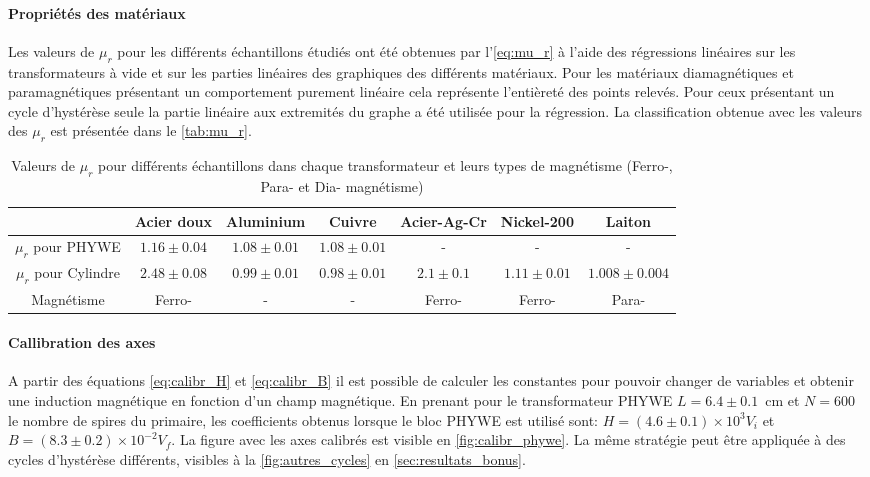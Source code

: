 \paragraph{Propriétés des matériaux}
Les valeurs de \(\mu_r\) pour les différents échantillons étudiés ont été obtenues par l'\autoref{eq:mu_r} à l'aide des régressions linéaires sur les transformateurs à vide et sur les parties linéaires des graphiques des différents matériaux. Pour les matériaux diamagnétiques et paramagnétiques présentant un comportement purement linéaire cela représente l'entièreté des points relevés. Pour ceux présentant un cycle d'hystérèse seule la partie linéaire aux extremités du graphe a été utilisée pour la régression. La classification obtenue avec les valeurs des \(\mu_r\) est présentée dans le \autoref{tab:mu_r}.

\begin{table}[h]
    \vspace{5pt}
    \centering
    \begin{adjustbox}{width=\textwidth}
        \begin{tabulary}{\linewidth}{|c c c c c c c|}
            \toprule
            & Acier doux & Aluminium & Cuivre & Acier-Ag-Cr & Nickel-200 & Laiton \\
            \midrule
            \(\mu_r\) pour PHYWE & \(1.16 \pm 0.04\) & \(1.08 \pm 0.01\) & \(1.08 \pm 0.01\) & - & - & - \\
            \(\mu_r\) pour Cylindre & \(2.48 \pm 0.08\) & \(0.99 \pm 0.01\) & \(0.98 \pm 0.01\) & \(2.1 \pm 0.1\) & \(1.11 \pm 0.01\) & \(1.008 \pm 0.004\) \\
            Magnétisme & Ferro- & - & - & Ferro- & Ferro- & Para- \\
            \bottomrule
        \end{tabulary}
    \end{adjustbox}
    \caption{Valeurs de \(\mu_r\) pour différents échantillons dans chaque transformateur et leurs types de magnétisme (Ferro-, Para- et Dia- magnétisme)}
    \label{tab:mu_r}
\end{table}

\paragraph{Callibration des axes}
A partir des équations \autoref{eq:calibr_H} et \autoref{eq:calibr_B} il est possible de calculer les constantes pour pouvoir changer de variables et obtenir une induction magnétique en fonction d'un champ magnétique. En prenant pour le transformateur PHYWE \mbox{\(L = 6.4 \pm 0.1\) \si{\centi \meter}} et \mbox{\(N = 600\)} le nombre de spires du primaire, les coefficients obtenus lorsque le bloc PHYWE est utilisé sont: \mbox{\(H = (4.6\pm0.1)\times10^3 V_i\)} et \mbox{\(B = (8.3\pm0.2)\times10^{-2} V_f\)}. La figure avec les axes calibrés est visible en \autoref{fig:calibr_phywe}. La même stratégie peut être appliquée à des cycles d'hystérèse différents, visibles à la \autoref{fig:autres_cycles} en \autoref{sec:resultats_bonus}.

